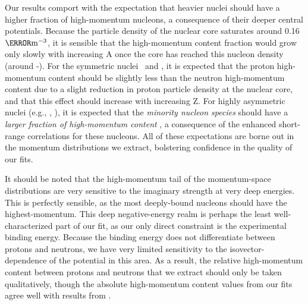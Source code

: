 Our results comport with the expectation that heavier nuclei should have a
higher fraction of high-momentum nucleons, a consequence of their deeper central
potentials. Because the particle density of the nuclear core saturates around
0.16 $\femto\meter^{-3}$, it is sensible that the
high-momentum content fraction would grow only slowly with increasing A once
the core has reached this nucleon density (around \cTwelve-\oSix).
For the symmetric nuclei \oSix\ and \caForty, it is expected that the proton
high-momentum content should be slightly less than the neutron high-momentum
content due to a slight reduction in proton particle density at the nuclear
core, and that this effect should increase with increasing Z. For highly asymmetric
nuclei (e.g., \snFour, \pbEight), it is expected that the \textit{minority
nucleon species} should have a \textit{larger fraction of high-momentum
content} \cite{Subedi2008, Hen2012}, a consequence of the enhanced
short-range correlations for these nucleons. All of these expectations are borne
out in the momentum distributions we extract, bolstering confidence in the
quality of our fits.

It should be noted that the high-momentum tail of the
momentum-space distributions are very sensitive to the imaginary
strength at very deep energies. This is perfectly sensible, as the most deeply-bound
nucleons should have the highest-momentum. This deep
negative-energy realm is perhaps the least well-characterized part of our fit,
as our only direct constraint is the experimental binding energy. Because the
binding energy does not differentiate between protons and neutrons, we have
very limited sensitivity to the isovector-dependence of the potential in
this area. As a result, the relative high-momentum content between protons and
neutrons that we extract should only be taken qualitatively, though the absolute
high-momentum content values from our fits agree well with results from
\cite{Rohe2004, RoheHabilitation}.


